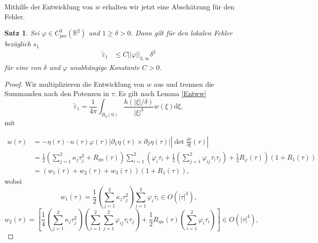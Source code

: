 \documentclass[12pt,a4paper]{scrartcl}
\newtheorem{Satz}{Satz}[section]
\newcommand{\dd}{\mathrm{d}}
\numberwithin{equation}{section}
\newcommand{\R}{\mathbb{R}} %
\newcommand{\per}{\operatorname{per}}
\begin{document}
Mithilfe der Entwicklung von $w$ erhalten wir jetzt eine Abschätzung für den Fehler.

\begin{Satz} \label{Seps1}
Sei $\varphi \in C^3_{\per}(\R^2)$ und $1\geq\delta >0$. Dann gilt für den lokalen Fehler bezüglich $s_1$
\begin{align*}
\widetilde \varepsilon_1 & \leq C ||\varphi||_{3,\infty} \delta^3
\end{align*}
für eine von $\delta$ und $\varphi$ unabhängige Konstante $C>0$.
\end{Satz}
\begin{proof}
Wir multiplizieren die Entwicklung von $w$ aus und trennen die Summanden nach den Potenzen in $\tau$.
Es gilt nach Lemma \ref{Entww}
\begin{equation*}
\widetilde \varepsilon_1 = \frac{1}{4 \pi} \int_{B_d(0)}  \frac{h(|\xi|/\delta)}{|\xi|^3} w(\xi)\dd \xi,
\end{equation*}
mit 

\begin{align*}
w(\tau)&= -\eta(\tau) \cdot n(\tau) \varphi(\tau)|\partial_1 \eta (\tau) \times \partial_2 \eta(\tau)||\operatorname{det}\frac{\partial\tau}{\partial\xi}(\tau)| \\
&=\frac{1}{2} \left(\sum_{j=1}^2 \kappa_j \tau_j^2 +R_{\eta n}(\tau) \right)
\sum_{i=1}^2\left(\varphi_i \tau_i + \frac{1}{2}\left(\sum_{j=1}^2\varphi_{ij}\tau_i\tau_j \right) + \frac{1}{2}R_\varphi(\tau)\right)(1+ R_1(\tau)) \\
&=(w_1(\tau) + w_2(\tau) +w_3(\tau))(1+R_1(\tau)),
\end{align*} 
wobei 
\[
w_1(\tau)=\frac{1}{2}\left(\sum_{j=1}^2 \kappa_j \tau_j^2\right)\sum_{i=1}^2\varphi_i \tau_i \in O(|\tau|^3),
\]
\[
w_2(\tau)=\left[
\frac{1}{4}\left(\sum_{j=1}^2 \kappa_j \tau_j^2\right) \left(\sum_{i=1}^2 \sum_{j=1}^2\varphi_{ij}\tau_i\tau_j \right)
+ \frac{1}{2}R_{\eta n}(\tau)  \left(\sum_{i=1}^2\varphi_i \tau_i\right)
\right]  \in O(|\tau|^4),
\]



\end{proof}
\end{document}
